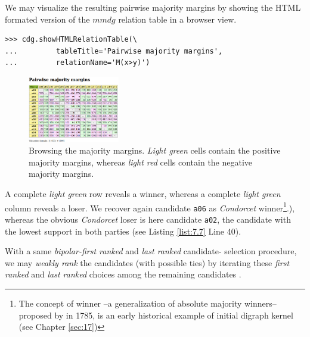 We may visualize the resulting pairwise majority margins by showing the HTML formated version of the $mmdg$ relation table in a browser view.
\begin{lstlisting}
>>> cdg.showHTMLRelationTable(\
...         tableTitle='Pairwise majority margins',
...         relationName='M(x>y)')
\end{lstlisting}
\begin{figure}[h]
\sidecaption[t]
\includegraphics[width=4cm]{Figures/majorityMargins.png}
\caption{Browsing the majority margins. \emph{Light green} cells contain the positive majority margins, whereas \emph{light red} cells contain the negative majority margins.}
\label{fig:7.4}       %
\end{figure}

A complete \emph{light green} row reveals a \Condorcet winner, whereas a complete \emph{light green} column reveals a \Condorcet loser. We recover again candidate \texttt{a06} as \emph{Condorcet} winner\footnote{The concept of \Condorcet winner --a generalization of absolute majority winners-- proposed by \Condorcet in 1785, is an early historical example of initial digraph kernel (see Chapter \ref{sec:17})}.), whereas the obvious \emph{Condorcet} loser is here candidate \texttt{a02}, the candidate with the lowest support in both parties (see Listing \ref{list:7.7} Line 40).

With a same \emph{bipolar-first ranked} and \emph{last ranked} candidate- selection procedure, we may \emph{weakly rank} the candidates (with possible ties) by iterating these \emph{first ranked} and \emph{last ranked} choices among the remaining candidates \citep{BIS-1999}.

